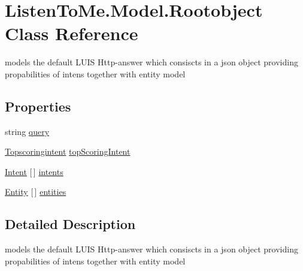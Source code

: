 \hypertarget{class_listen_to_me_1_1_model_1_1_rootobject}{}\section{Listen\+To\+Me.\+Model.\+Rootobject Class Reference}
\label{class_listen_to_me_1_1_model_1_1_rootobject}


models the default L\+U\+IS Http-\/answer which consiscts in a json object providing propabilities of intens together with entity model  


\subsection*{Properties}
\begin{DoxyCompactItemize}
\item 
string \mbox{\hyperlink{class_listen_to_me_1_1_model_1_1_rootobject_adad3e848ab548426bf08f2a4e72406d9}{query}}
\item 
\mbox{\hyperlink{class_listen_to_me_1_1_model_1_1_topscoringintent}{Topscoringintent}} \mbox{\hyperlink{class_listen_to_me_1_1_model_1_1_rootobject_a01604703f06c73a21555365a7619b6a5}{top\+Scoring\+Intent}}
\item 
\mbox{\hyperlink{class_listen_to_me_1_1_model_1_1_intent}{Intent}} \mbox{[}$\,$\mbox{]} \mbox{\hyperlink{class_listen_to_me_1_1_model_1_1_rootobject_ad59ca4d5e32b1963884203c0e83c8e18}{intents}}
\item 
\mbox{\hyperlink{class_listen_to_me_1_1_model_1_1_entity}{Entity}} \mbox{[}$\,$\mbox{]} \mbox{\hyperlink{class_listen_to_me_1_1_model_1_1_rootobject_a95eb6979506b4876f2fd9ef010706d1f}{entities}}
\end{DoxyCompactItemize}


\subsection{Detailed Description}
models the default L\+U\+IS Http-\/answer which consiscts in a json object providing propabilities of intens together with entity model 



